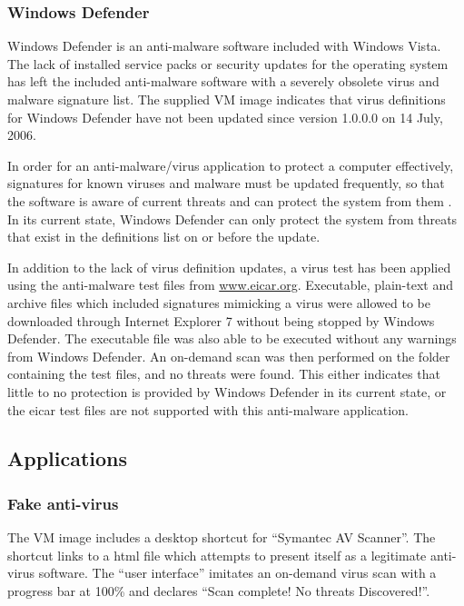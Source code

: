 \subsubsection{Windows Defender}

Windows Defender is an anti-malware software included with Windows Vista. The lack of installed service packs or security updates for the operating system has left the included anti-malware software with a severely obsolete virus and malware signature list. The supplied VM image indicates that virus definitions for Windows Defender have not been updated since version 1.0.0.0 on 14 July, 2006.

In order for an anti-malware/virus application to protect a computer effectively, signatures for known viruses and malware must be updated frequently, so that the software is aware of current threats and can protect the system from them \citep{Goodrich2011}. In its current state, Windows Defender can only protect the system from threats that exist in the definitions list on or before the update.

In addition to the lack of virus definition updates, a virus test has been applied using the anti-malware test files from \href{http://www.eicar.org/85-0-Download.html}{www.eicar.org}. Executable, plain-text and archive files which included signatures mimicking a virus were allowed to be downloaded through Internet Explorer 7 without being stopped by Windows Defender. The executable file was also able to be executed without any warnings from Windows Defender. An on-demand scan was then performed on the folder containing the test files, and no threats were found. This either indicates that little to no protection is provided by Windows Defender in its current state, or the eicar test files are not supported with this anti-malware application.

\subsection{Applications}

\subsubsection{Fake anti-virus}

The VM image includes a desktop shortcut for ``Symantec AV Scanner''. The shortcut links to a html file which attempts to present itself as a legitimate anti-virus software. The ``user interface'' imitates an on-demand virus scan with a progress bar at 100\% and declares ``Scan complete! No threats Discovered!''.

